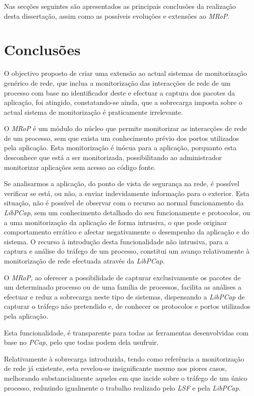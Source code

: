 Nas secções seguintes são apresentados as principais conclusões da realização desta dissertação, assim como as possíveis evoluções e extensões ao \textit{MRoP}.

\section{Conclusões}
\label{sec:conclusoes}

O objectivo proposto de criar uma extensão ao actual sistemas de monitorização genérico de rede, que inclua a monitorização das interacções de rede de um processo com base no identificador deste e efectuar a captura dos pacotes da aplicação, foi atingido, constatando-se ainda, que a sobrecarga imposta sobre o actual sistema de monitorização é praticamente irrelevante.

O \textit{MRoP} é um módulo do núcleo que permite monitorizar as interacções de rede de um processo, sem que exista um conhecimento prévio dos portos utilizados pela aplicação.
Esta monitorização é inócua para a aplicação, porquanto esta desconhece que está a ser monitorizada, possibilitando ao administrador monitorizar aplicações sem acesso ao código fonte.

Se analisarmos a aplicação, do ponto de vista de segurança na rede, é possível verificar se está, ou não, a enviar indevidamente informação para o exterior.
Esta situação, não é possível de observar com o recurso ao normal funcionamento da \textit{LibPCap}, sem um conhecimento detalhado do seu funcionamente e protocolos, ou a uma monitorização da aplicação de forma intrusiva, o que pode originar comportamento errático e afectar negativamente o desempenho da aplicação e do sistema.
O recurso à introdução desta funcionalidade não intrusiva, para a captura e análise do tráfego de um processo, constitui um avanço relativamente à monitorização de rede efectuada através da \textit{LibPCap}.

O \textit{MRoP}, ao oferecer a possibilidade de capturar exclusivamente os pacotes de um determinado processo ou de uma família de processos, facilita as análises a efectuar e reduz a sobrecarga neste tipo de sistemas, dispensando a \textit{LibPCap} de capturar o tráfego não pretendido e, de conhecer os protocolos e portos utilizados pela aplicação.

Esta funcionalidade, é transparente para todas as ferramentas desenvolvidas com base no \textit{PCap}, pelo que todas podem dela usufruir.

Relativamente à sobrecarga introduzida, tendo como referência a monitorização de rede já existente, esta revelou-se insignificante mesmo nos piores casos, melhorando substancialmente aqueles em que incide sobre o tráfego de um único processo, reduzindo igualmente o trabalho realizado pelo \textit{LSF} e pela \textit{LibPCap}.

